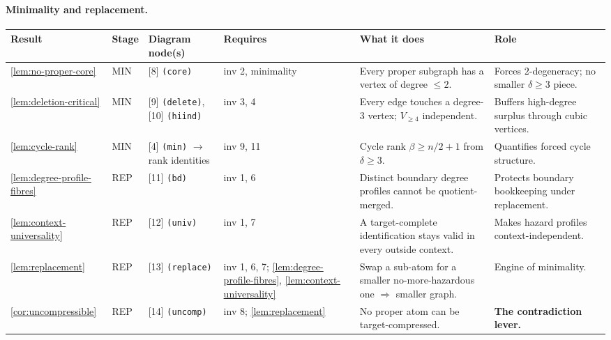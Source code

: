 \documentclass[11pt]{article}
\begin{document}
\paragraph{Minimality and replacement.}
{\scriptsize\setlength{\tabcolsep}{3pt}
\begin{longtable}{L{0.10\textwidth} C{0.045\textwidth} L{0.13\textwidth} L{0.135\textwidth} L{0.28\textwidth} L{0.20\textwidth}}
\toprule
\textbf{Result} & \textbf{Stage} & \textbf{Diagram node(s)} & \textbf{Requires} & \textbf{What it does} & \textbf{Role} \\
\midrule
\endhead
\cref{lem:no-proper-core} & MIN & [8] \texttt{(core)} & inv 2, minimality & Every proper subgraph has a vertex of degree $\le2$. & Forces $2$-degeneracy; no smaller $\delta\ge3$ piece. \\
\cref{lem:deletion-critical} & MIN & [9] \texttt{(delete)}, [10] \texttt{(hiind)} & inv 3, 4 & Every edge touches a degree-$3$ vertex; $V_{\ge4}$ independent. & Buffers high-degree surplus through cubic vertices. \\
\cref{lem:cycle-rank} & MIN & [4] \texttt{(min)} $\to$ rank identities & inv 9, 11 & Cycle rank $\beta\ge n/2+1$ from $\delta\ge3$. & Quantifies forced cycle structure. \\
\cref{lem:degree-profile-fibres} & REP & [11] \texttt{(bd)} & inv 1, 6 & Distinct boundary degree profiles cannot be quotient-merged. & Protects boundary bookkeeping under replacement. \\
\cref{lem:context-universality} & REP & [12] \texttt{(univ)} & inv 1, 7 & A target-complete identification stays valid in every outside context. & Makes hazard profiles context-independent. \\
\cref{lem:replacement} & REP & [13] \texttt{(replace)} & inv 1, 6, 7; \cref{lem:degree-profile-fibres}, \cref{lem:context-universality} & Swap a sub-atom for a smaller no-more-hazardous one $\Rightarrow$ smaller graph. & Engine of minimality. \\
\cref{cor:uncompressible} & REP & [14] \texttt{(uncomp)} & inv 8; \cref{lem:replacement} & No proper atom can be target-compressed. & \textbf{The contradiction lever.} \\
\bottomrule
\end{longtable}
}
\end{document}
